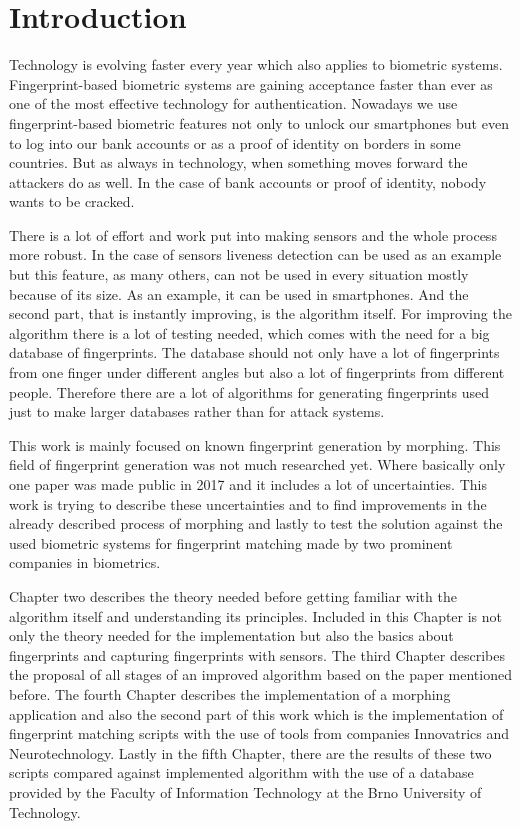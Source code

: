 \chapter{Introduction}
Technology is evolving faster every year which also applies to biometric systems. Fingerprint-based biometric systems are gaining acceptance faster than ever as one of the most effective technology for authentication. Nowadays we use fingerprint-based biometric features not only to unlock our smartphones but even to log into our bank accounts or as a proof of identity on borders in some countries. But as always in technology, when something moves forward the attackers do as well. In the case of bank accounts or proof of identity, nobody wants to be cracked.

There is a lot of effort and work put into making sensors and the whole process more robust. In the case of sensors liveness detection can be used as an example but this feature, as many others, can not be used in every situation mostly because of its size. As an example, it can be used in smartphones. And the second part, that is instantly improving, is the algorithm itself. For improving the algorithm there is a lot of testing needed, which comes with the need for a big database of fingerprints. The database should not only have a lot of fingerprints from one finger under different angles but also a lot of fingerprints from different people. Therefore there are a lot of algorithms for generating fingerprints used just to make larger databases rather than for attack systems.

This work is mainly focused on known fingerprint generation by morphing. This field of fingerprint generation was not much researched yet. Where basically only one paper was made public in 2017 and it includes a lot of uncertainties. This work is trying to describe these uncertainties and to find improvements in the already described process of morphing and lastly to test the solution against the used biometric systems for fingerprint matching made by two prominent companies in biometrics.

Chapter two describes the theory needed before getting familiar with the algorithm itself and understanding its principles. Included in this Chapter is not only the theory needed for the implementation but also the basics about fingerprints and capturing fingerprints with sensors. The third Chapter describes the proposal of all stages of an improved algorithm based on the paper mentioned before. The fourth Chapter describes the implementation of a morphing application and also the second part of this work which is the implementation of fingerprint matching scripts with the use of tools from companies Innovatrics and Neurotechnology. Lastly in the fifth Chapter, there are the results of these two scripts compared against implemented algorithm with the use of a database provided by the Faculty of Information Technology at the Brno University of Technology.

